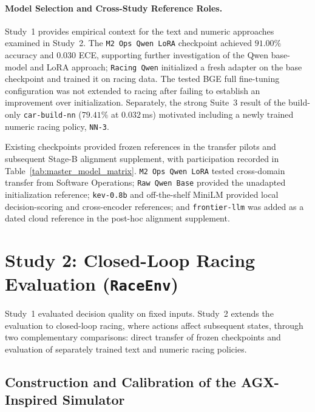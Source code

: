 \documentclass[11pt,a4paper]{article}
\begin{document}
\paragraph{Model Selection and Cross-Study Reference Roles.}
Study~1 provides empirical context for the text and numeric approaches examined in Study~2. The \texttt{M2 Ops Qwen LoRA} checkpoint achieved $91.00\%$ accuracy and $0.030$ ECE, supporting further investigation of the Qwen base-model and LoRA approach; \texttt{Racing Qwen} initialized a fresh adapter on the base checkpoint and trained it on racing data. The tested BGE full fine-tuning configuration was not extended to racing after failing to establish an improvement over initialization. Separately, the strong Suite~3 result of the build-only \texttt{car-build-nn} ($79.41\%$ at $0.032$\,ms) motivated including a newly trained numeric racing policy, \texttt{NN-3}.

Existing checkpoints provided frozen references in the transfer pilots and subsequent Stage-B alignment supplement, with participation recorded in Table~\ref{tab:master_model_matrix}. \texttt{M2 Ops Qwen LoRA} tested cross-domain transfer from Software Operations; \texttt{Raw Qwen Base} provided the unadapted initialization reference; \texttt{kev-0.8b} and off-the-shelf MiniLM provided local decision-scoring and cross-encoder references; and \texttt{frontier-llm} was added as a dated cloud reference in the post-hoc alignment supplement.

\section{Study 2: Closed-Loop Racing Evaluation (\texttt{RaceEnv})}

Study~1 evaluated decision quality on fixed inputs. Study~2 extends the evaluation to closed-loop racing, where actions affect subsequent states, through two complementary comparisons: direct transfer of frozen checkpoints and evaluation of separately trained text and numeric racing policies.

\subsection{Construction and Calibration of the AGX-Inspired Simulator}
\end{document}
